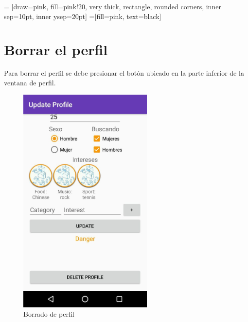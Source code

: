 \documentclass[10pt,letterpaper,extrafontsizes]{memoir}
\begin{document}
\begin{center}
 = [draw=pink, fill=pink!20, very thick,
    rectangle, rounded corners, inner sep=10pt, inner ysep=20pt]
 =[fill=pink, text=black]
\end{center}
%

\section{Borrar el perfil}

Para borrar el perfil se debe presionar el botón ubicado en la parte inferior de la ventana de perfil.

\begin{figure}[H]
    \centering
\includegraphics[width=0.6\textwidth]{graficos/capturas/m}
    \caption{Borrado de perfil}
    \label{fig:delete}
\end{figure}
\end{document}
